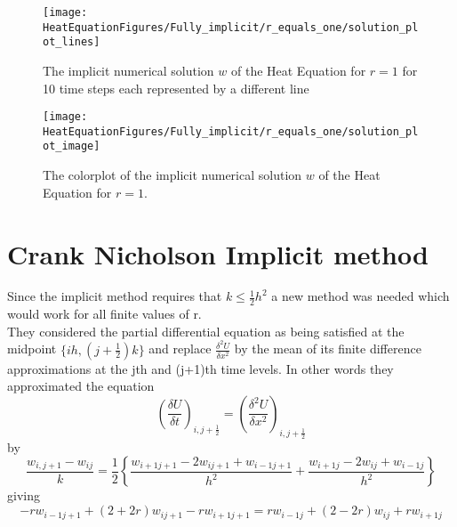 \begin{example}
\begin{figure}[H]
  \caption{The implicit numerical solution $w$ of the Heat Equation for $r=1$ for 10 time steps each represented by a different line}
  \centering
    \texttt{[image: HeatEquationFigures/Fully\_implicit/r\_equals\_one/solution\_plot\_lines]}
\end{figure}


\begin{figure}[H]
  \caption{The colorplot of the implicit numerical solution $w$ of the Heat Equation for $r=1$.}
  \centering
    \texttt{[image: HeatEquationFigures/Fully\_implicit/r\_equals\_one/solution\_plot\_image]}
\end{figure}
\end{example}


\section{Crank Nicholson Implicit method}
Since the implicit method requires that $k\leq \frac{1}{2}h^2$ a new method was
needed which would work for all finite values of r.\\
They considered the partial differential equation as being satisfied at the
midpoint $\{ih,(j+\frac{1}{2})k \}$ and replace $\frac{\delta^2 U}{\delta x^2}$ by the
mean of its finite difference approximations at the jth and (j+1)th time levels.
In other words they approximated the equation
\[ \left(\frac{\delta U}{\delta t}\right)_{i,j+\frac{1}{2}}
= 
 \left(\frac{\delta^2 U}{\delta x^2}\right)_{i,j+\frac{1}{2}}\]
by
\[\frac{w_{i,j+1}-w_{ij}}{k}=\frac{1}{2}\left\{\frac{w_{i+1j+1}-2w_{ij+1}+w_{i-1j+1}}{h^2}+
\frac{w_{i+1j}-2w_{ij}+w_{i-1j}}{h^2}
\right\}
\]
giving
\begin{equation}
\label{2 crank}
-rw_{i-1j+1}+(2+2r)w_{ij+1}-rw_{i+1j+1}
=
rw_{i-1j}+(2-2r)w_{ij}+rw_{i+1j}
\end{equation}

